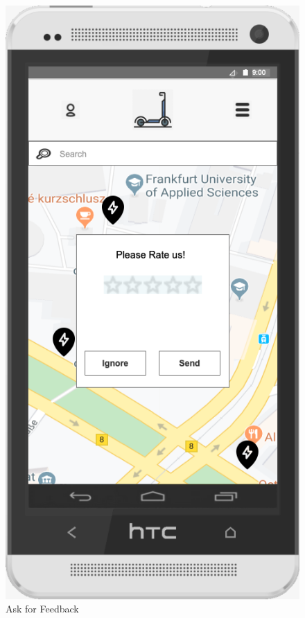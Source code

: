 \documentclass[a4paper, 12pt]{article}
\begin{document}
\begin{figure} [htbp]
  \begin{center}
    \includegraphics[scale=0.5]{images/prototypes/04-ask-for-feedback.png}
  \end{center}
  \caption{Ask for Feedback}
\end{figure}
\end{document}
